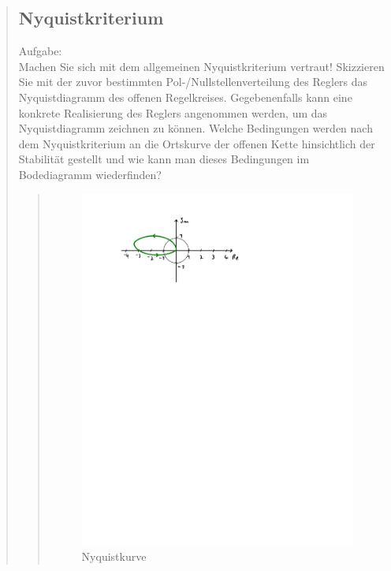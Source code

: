 \begin{quote}
\begin{quote}
        
	\end{quote} %
	
	\subsection{Nyquistkriterium}
	Aufgabe:\\
    Machen Sie sich mit dem allgemeinen Nyquistkriterium vertraut! Skizzieren Sie mit der zuvor bestimmten
    Pol-/Nullstellenverteilung des Reglers das Nyquistdiagramm des offenen Regelkreises. Gegebenenfalls kann eine
    konkrete Realisierung des Reglers angenommen werden, um das Nyquistdiagramm zeichnen zu können. Welche Bedingungen
    werden nach dem Nyquistkriterium an die Ortskurve der offenen Kette hinsichtlich der Stabilität gestellt und wie
    kann man dieses Bedingungen im Bodediagramm wiederfinden?
    \begin{quote} 
   
    \begin{figure}[H]
        \centering
            \includegraphics[scale=1, trim = 3cm 21.5cm 9cm 1.5cm, clip]{Bilder/Nyquist_kurve}
                \caption{Nyquistkurve}
                \label{fig:Nyquist_kurve}
        \end{figure}
        

\end{quote}
\end{quote}
